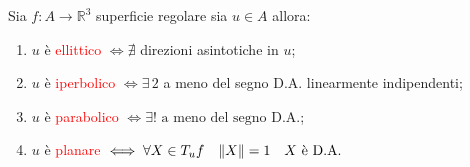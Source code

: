         \begin{proposizione}
        \label{prop:classificazione_punti_su_una_superficie}
        Sia $f : A \to \mathbb{R}^3$ superficie regolare sia $u \in A$ allora:
        \begin{enumerate}[label=\arabic*)]
            \item $u$ è \textcolor{red}{ellittico} $\iff \nexists$ direzioni asintotiche in $u$;
            \item $u$ è \textcolor{red}{iperbolico} $\iff \exists \, 2$ a meno del segno D.A. linearmente indipendenti;
            \item $u$ è \textcolor{red}{parabolico} $\iff \exists ! \text{ a meno del segno D.A.}$;
            \item $u$ è \textcolor{red}{planare} $\iff \forall X \in T_u f \quad \lVert X\rVert = 1 \quad X \text{ è D.A.}$
        \end{enumerate}
        \end{proposizione}
